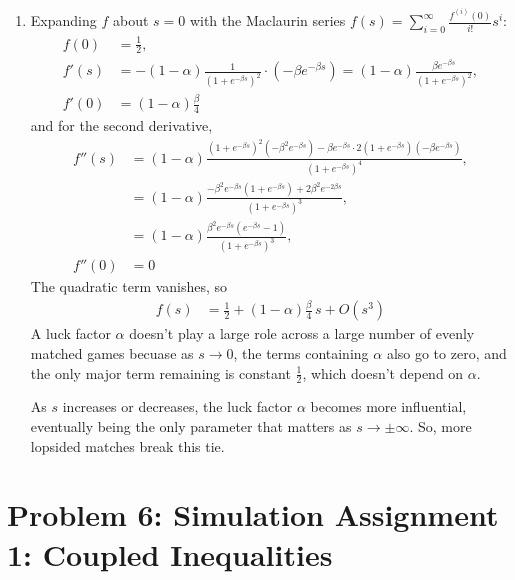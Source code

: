 \documentclass[11pt]{article}
\begin{document}
\begin{enumerate}[label=(\alph*)]
  \item Expanding $f$ about $s = 0$ with the Maclaurin series
  $f(s) = \sum_{i=0}^{\infty} \frac{f^{(i)}(0)}{i!}s^i$:
  \begin{align}
    f(0) &= \frac{1}{2}, \\
    f'(s) &= -(1-\alpha)\frac{1}{(1+e^{-\beta s})^2}\cdot\left(-\beta e^{-\beta s}\right)
      = (1-\alpha)\frac{\beta e^{-\beta s}}{(1+e^{-\beta s})^2}, \\
    f'(0) &= (1-\alpha)\frac{\beta}{4}
  \end{align}
  and for the second derivative,
  \begin{align}
    f''(s) &= (1-\alpha)\frac{(1+e^{-\beta s})^2\left(-\beta^2 e^{-\beta s}\right)
      - \beta e^{-\beta s}\cdot 2(1+e^{-\beta s})\left(-\beta e^{-\beta s}\right)}{(1+e^{-\beta s})^4}, \\
    &= (1-\alpha)\frac{-\beta^2 e^{-\beta s}(1+e^{-\beta s}) + 2\beta^2 e^{-2\beta s}}{(1+e^{-\beta s})^3}, \\
    &= (1-\alpha)\frac{\beta^2 e^{-\beta s}\left(e^{-\beta s} - 1\right)}{(1+e^{-\beta s})^3}, \\
    f''(0) &= 0
  \end{align}
  The quadratic term vanishes, so
  \begin{align}
    f(s) &= \frac{1}{2} + (1-\alpha)\frac{\beta}{4}\,s + O(s^3)
  \end{align}
  A luck factor $\alpha$ doesn't play a large role across a
  large number of evenly matched games becuase as $s \to 0$, the terms containing $\alpha$ also go to zero, and the only major term remaining is 
  constant $\tfrac{1}{2}$, which doesn't depend on $\alpha$.

  As $s$ increases or decreases, the luck factor $\alpha$ becomes more influential, eventually being
  the only parameter that matters as $s \to \pm\infty$. So, more lopsided matches break this tie.
\end{enumerate}

\section*{Problem 6: Simulation Assignment 1: Coupled Inequalities}
\end{document}
